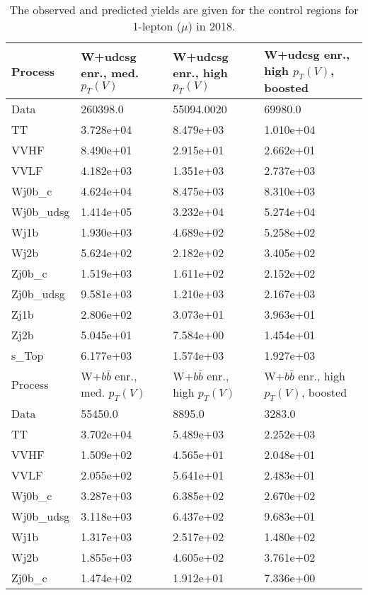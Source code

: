 \begin{table}
\centering
\caption[2018 1-lepton ($\mu$) control region yields]{
                  The observed and predicted yields are given for the
                  control regions for 1-lepton ($\mu$) in 2018.
                  }
{\footnotesize
\begin{tabularx}{0.8\textwidth}{|X|X|X|X|}
\hline
Process & W+udcsg enr., med. $p_{T}(V)$ & W+udcsg enr., high $p_{T}(V)$ & W+udcsg enr., high $p_{T}(V)$, boosted \\
\hline
Data & 260398.0 & 55094.0020 & 69980.0 \\
\hline
TT & 3.728e+04 & 8.479e+03 & 1.010e+04 \\
VVHF & 8.490e+01 & 2.915e+01 & 2.662e+01 \\
VVLF & 4.182e+03 & 1.351e+03 & 2.737e+03 \\
Wj0b\_c & 4.624e+04 & 8.475e+03 & 8.310e+03 \\
Wj0b\_udsg & 1.414e+05 & 3.232e+04 & 5.274e+04 \\
Wj1b & 1.930e+03 & 4.689e+02 & 5.258e+02 \\
Wj2b & 5.624e+02 & 2.182e+02 & 3.405e+02 \\
Zj0b\_c & 1.519e+03 & 1.611e+02 & 2.152e+02 \\
Zj0b\_udsg & 9.581e+03 & 1.210e+03 & 2.167e+03 \\
Zj1b & 2.806e+02 & 3.073e+01 & 3.963e+01 \\
Zj2b & 5.045e+01 & 7.584e+00 & 1.454e+01 \\
s\_Top & 6.177e+03 & 1.574e+03 & 1.927e+03 \\
\hline
\hline
Process & W+$b\bar{b}$ enr., med. $p_{T}(V)$ & W+$b\bar{b}$ enr., high $p_{T}(V)$ & W+$b\bar{b}$ enr., high $p_{T}(V)$, boosted \\
\hline
Data & 55450.0 & 8895.0 & 3283.0 \\
\hline
TT & 3.702e+04 & 5.489e+03 & 2.252e+03 \\
VVHF & 1.509e+02 & 4.565e+01 & 2.048e+01 \\
VVLF & 2.055e+02 & 5.641e+01 & 2.483e+01 \\
Wj0b\_c & 3.287e+03 & 6.385e+02 & 2.670e+02 \\
Wj0b\_udsg & 3.118e+03 & 6.437e+02 & 9.683e+01 \\
Wj1b & 1.317e+03 & 2.517e+02 & 1.480e+02 \\
Wj2b & 1.855e+03 & 4.605e+02 & 3.761e+02 \\
Zj0b\_c & 1.474e+02 & 1.912e+01 & 7.336e+00 \\

\end{tabularx}}
\end{table}
